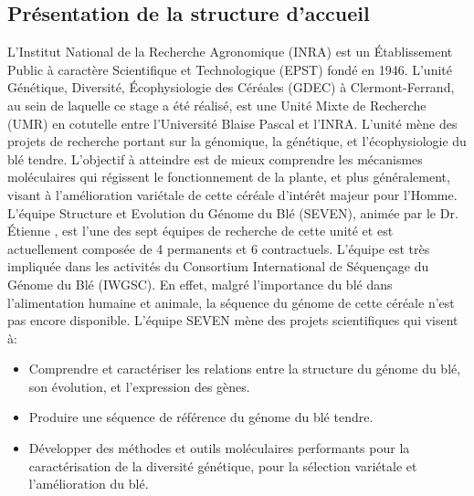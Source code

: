 \documentclass[a4paper, 12pt]{article}
\begin{document}
\begin{onehalfspace}

\newpage
\thispagestyle{empty}
\parindent=1.5cm
{\setlength{\baselineskip}{0.95\baselineskip}
\tableofcontents\par}

\newpage
\thispagestyle{empty}
\null


\newpage
\setcounter{page}{1}

\part{Présentation de la structure d'accueil}
L'Institut National de la Recherche Agronomique (INRA) est un Établissement Public à caractère Scientifique et Technologique (EPST) fondé en 1946. L'unité Génétique, Diversité, Écophysiologie des Céréales (GDEC) à Clermont-Ferrand, au sein de laquelle ce stage a été réalisé, est une Unité Mixte de Recherche (UMR) en cotutelle entre l'Université Blaise Pascal et l'INRA. L'unité mène des projets de recherche portant sur la génomique, la génétique, et l'écophysiologie du blé tendre. L'objectif à atteindre est de mieux comprendre les mécanismes moléculaires qui régissent le fonctionnement de la plante, et plus généralement, visant à l'amélioration variétale de cette céréale d'intérêt majeur pour l'Homme.\\

L'équipe Structure et Evolution du Génome du Blé (SEVEN), animée par le Dr. Étienne , est l'une des sept équipes de recherche de cette unité et est actuellement composée de 4 permanents et 6 contractuels. L'équipe est très impliquée dans les activités du Consortium International de Séquençage du Génome du Blé (IWGSC). En effet, malgré l'importance du blé dans l'alimentation humaine et animale, la séquence du génome de cette céréale n'est pas encore disponible. L'équipe SEVEN mène des projets scientifiques qui visent à:
\begin{itemize}
 \item Comprendre et caractériser les relations entre la structure du génome du blé, son évolution, et l'expression des gènes.
 \item Produire une séquence de référence du génome du blé tendre.
 \item Développer des méthodes et outils moléculaires performants pour la caractérisation de la diversité génétique, pour la sélection variétale et l'amélioration du blé.
\end{itemize}


\end{onehalfspace}
\end{document}
